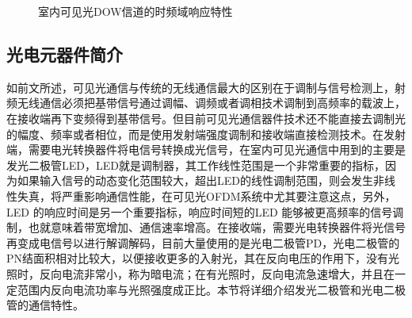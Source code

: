 \begin{figure}[htbp]
    \centering
    \caption{室内可见光DOW信道的时频域响应特性}
    \label{fig:DOWChannelResponse}
\end{figure}
\subsection{光电元器件简介}
如前文所述，可见光通信与传统的无线通信最大的区别在于调制与信号检测上，射频无线通信必须把基带信号通过调幅、调频或者调相技术调制到高频率的载波上，在接收端再下变频得到基带信号。但目前可见光通信器件技术还不能直接去调制光的幅度、频率或者相位，而是使用发射端强度调制和接收端直接检测技术。在发射端，需要电光转换器件将电信号转换成光信号，在室内可见光通信中用到的主要是发光二极管LED，LED就是调制器，其工作线性范围是一个非常重要的指标，因为如果输入信号的动态变化范围较大，超出LED的线性调制范围，则会发生非线性失真，将严重影响通信性能，在可见光OFDM系统中尤其要注意这点，另外，LED 的响应时间是另一个重要指标，响应时间短的LED 能够被更高频率的信号调制，也就意味着带宽增加、通信速率增高。在接收端，需要光电转换器件将光信号再变成电信号以进行解调解码，目前大量使用的是光电二极管PD，光电二极管的PN结面积相对比较大，以便接收更多的入射光，其在反向电压的作用下，没有光照时，反向电流非常小，称为暗电流；在有光照时，反向电流急速增大，并且在一定范围内反向电流功率与光照强度成正比。本节将详细介绍发光二极管和光电二极管的通信特性。
